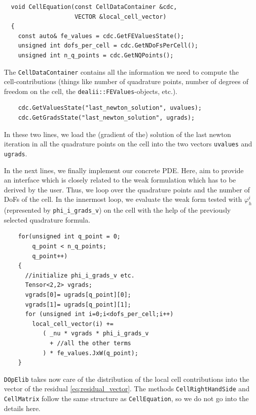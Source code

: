 \documentclass[smallextended]{svjour3}       %
\numberwithin{equation}{section}
\renewcommand{\phi}{\varphi}
\newcommand{\dope}{\texttt{DOpElib}}
\begin{document}
\begin{lstlisting}
  void CellEquation(const CellDataContainer &cdc,
                    VECTOR &local_cell_vector)
  {
    const auto& fe_values = cdc.GetFEValuesState();
    unsigned int dofs_per_cell = cdc.GetNDoFsPerCell();
    unsigned int n_q_points = cdc.GetNQPoints();
\end{lstlisting}
 The \texttt{CellDataContainer} contains all the information we need to compute the cell-contributions (things like number of quadrature points, number of degrees of freedom on the cell, the \texttt{dealii::FEValues}-objects, etc.).
  \begin{lstlisting}
    cdc.GetValuesState("last_newton_solution", uvalues);
    cdc.GetGradsState("last_newton_solution", ugrads);
 \end{lstlisting}
 In these two lines, we load the (gradient of the) solution of the last newton iteration in all the quadrature points on the cell into the two vectors \texttt{uvalues} and \texttt{ugrads}.

In the next lines, we finally implement our concrete PDE. Here, aim to provide 
an interface which is closely related to the weak formulation which 
has to be derived by the user. Thus,
we loop over the quadrature points and the number of DoFs of the cell. In the innermost loop, we evaluate the weak form tested with $\phi_{h}^i$ (represented by \texttt{phi\_i\_grads\_v}) on the cell with the help of the previously selected quadrature formula. 
 \begin{lstlisting}
    for(unsigned int q_point = 0; 
        q_point < n_q_points; 
        q_point++)
    {
      //initialize phi_i_grads_v etc.
      Tensor<2,2> vgrads;
      vgrads[0]= ugrads[q_point][0]; 
      vgrads[1]= ugrads[q_point][1];
      for (unsigned int i=0;i<dofs_per_cell;i++)
        local_cell_vector(i) += 
           ( _nu * vgrads * phi_i_grads_v 
             + //all the other terms
           ) * fe_values.JxW(q_point);
    }
\end{lstlisting}
\dope{} takes now care of the distribution of the local cell contributions into  the vector of the residual \eqref{eq:residual_vector}. The methods \texttt{CellRightHandSide} and \texttt{CellMatrix} follow the same structure as 
\texttt{CellEquation}, so we do not go into the details here.
\end{document}
